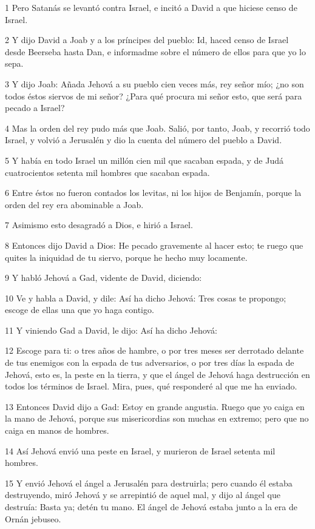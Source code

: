 \par 1 Pero Satanás se levantó contra Israel, e incitó a David a que hiciese censo de Israel.
\par 2 Y dijo David a Joab y a los príncipes del pueblo: Id, haced censo de Israel desde Beerseba hasta Dan, e informadme sobre el número de ellos para que yo lo sepa.
\par 3 Y dijo Joab: Añada Jehová a su pueblo cien veces más, rey señor mío; ¿no son todos éstos siervos de mi señor? ¿Para qué procura mi señor esto, que será para pecado a Israel?
\par 4 Mas la orden del rey pudo más que Joab. Salió, por tanto, Joab, y recorrió todo Israel, y volvió a Jerusalén y dio la cuenta del número del pueblo a David.
\par 5 Y había en todo Israel un millón cien mil que sacaban espada, y de Judá cuatrocientos setenta mil hombres que sacaban espada.
\par 6 Entre éstos no fueron contados los levitas, ni los hijos de Benjamín, porque la orden del rey era abominable a Joab.
\par 7 Asimismo esto desagradó a Dios, e hirió a Israel.
\par 8 Entonces dijo David a Dios: He pecado gravemente al hacer esto; te ruego que quites la iniquidad de tu siervo, porque he hecho muy locamente.
\par 9 Y habló Jehová a Gad, vidente de David, diciendo:
\par 10 Ve y habla a David, y dile: Así ha dicho Jehová: Tres cosas te propongo; escoge de ellas una que yo haga contigo.
\par 11 Y viniendo Gad a David, le dijo: Así ha dicho Jehová:
\par 12 Escoge para ti: o tres años de hambre, o por tres meses ser derrotado delante de tus enemigos con la espada de tus adversarios, o por tres días la espada de Jehová, esto es, la peste en la tierra, y que el ángel de Jehová haga destrucción en todos los términos de Israel. Mira, pues, qué responderé al que me ha enviado.
\par 13 Entonces David dijo a Gad: Estoy en grande angustia. Ruego que yo caiga en la mano de Jehová, porque sus misericordias son muchas en extremo; pero que no caiga en manos de hombres.
\par 14 Así Jehová envió una peste en Israel, y murieron de Israel setenta mil hombres.
\par 15 Y envió Jehová el ángel a Jerusalén para destruirla; pero cuando él estaba destruyendo, miró Jehová y se arrepintió de aquel mal, y dijo al ángel que destruía: Basta ya; detén tu mano. El ángel de Jehová estaba junto a la era de Ornán jebuseo.
